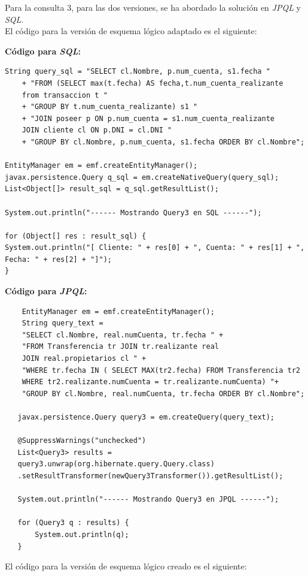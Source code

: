 \documentclass[11pt,a4paper]{article}
\begin{document}
\bigbreak
Para la consulta 3, para las dos versiones, se ha abordado la solución en \emph{JPQL} y \textit{SQL}. \\
El código para la versión de esquema lógico adaptado es el siguiente:

\bigbreak
\textbf{Código para \textit{SQL}:}
\begin{lstlisting}
String query_sql = "SELECT cl.Nombre, p.num_cuenta, s1.fecha "
	+ "FROM (SELECT max(t.fecha) AS fecha,t.num_cuenta_realizante 
	from transaccion t "
	+ "GROUP BY t.num_cuenta_realizante) s1 "
	+ "JOIN poseer p ON p.num_cuenta = s1.num_cuenta_realizante 
	JOIN cliente cl ON p.DNI = cl.DNI "
	+ "GROUP BY cl.Nombre, p.num_cuenta, s1.fecha ORDER BY cl.Nombre";

EntityManager em = emf.createEntityManager();
javax.persistence.Query q_sql = em.createNativeQuery(query_sql);
List<Object[]> result_sql = q_sql.getResultList();

System.out.println("------ Mostrando Query3 en SQL ------");

for (Object[] res : result_sql) {
System.out.println("[ Cliente: " + res[0] + ", Cuenta: " + res[1] + ", Fecha: " + res[2] + "]");
}
\end{lstlisting}

\bigbreak
\textbf{Código para \textit{JPQL}:}

\begin{lstlisting}
	EntityManager em = emf.createEntityManager();
	String query_text = 
    "SELECT cl.Nombre, real.numCuenta, tr.fecha " +
    "FROM Transferencia tr JOIN tr.realizante real 
    JOIN real.propietarios cl " + 
    "WHERE tr.fecha IN ( SELECT MAX(tr2.fecha) FROM Transferencia tr2 
    WHERE tr2.realizante.numCuenta = tr.realizante.numCuenta) "+
    "GROUP BY cl.Nombre, real.numCuenta, tr.fecha ORDER BY cl.Nombre";

   javax.persistence.Query query3 = em.createQuery(query_text);

   @SuppressWarnings("unchecked")
   List<Query3> results = 
   query3.unwrap(org.hibernate.query.Query.class)
   .setResultTransformer(newQuery3Transformer()).getResultList();

   System.out.println("------ Mostrando Query3 en JPQL ------");

   for (Query3 q : results) {
       System.out.println(q);
   }
\end{lstlisting}

\bigbreak
El código para la versión de esquema lógico creado es el siguiente:
\end{document}

